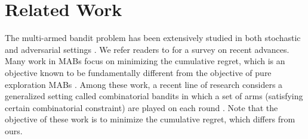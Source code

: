 \documentclass{article}
\newcommand{\Algorithm}{{\small \textsf{CLUCB}}\xspace}
\newcommand{\AlgorithmBud}{{\small \textsf{CSAR}}\xspace}
\newcommand{\Problem}{{CPE}\xspace}
\newcommand{\M}{\mathcal M}
\DeclareMathOperator{\rank}{width}
\begin{document}
\vspace{-1em}
\section{Related Work}
\vspace{-1em}
The multi-armed bandit problem has been extensively studied in both stochastic and adversarial settings \citep{lai1985asymptotically,auer2002nonstochastic,auer2002nonstochastic}.
We refer readers to \citep{bubeck2012regret} for a survey on recent advances.
Many work in MABs focus on minimizing the cumulative regret, which is an objective known to be fundamentally different from the objective of pure exploration MABs \citep{bubeck2010pure}.
Among these work, a recent line of research considers a generalized setting called combinatorial bandits in which a set of arms (satisfying certain combinatorial constraint) are played on each round \citep{cesa2012combinatorial,chen2013combinatorial,kale2010non,neu2010online,audibert2009minimax,Bubeck12towardsminimax,gopalan2014thompson,lin2014,kveton2014matroid}.
Note that the objective of these work is to minimize the cumulative regret, which differs from ours.
\end{document}
